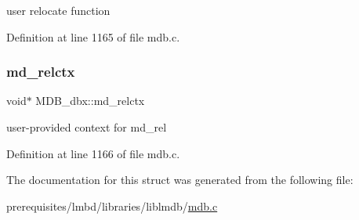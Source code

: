 user relocate function 

Definition at line 1165 of file mdb.\+c.

\mbox{\label{struct_m_d_b__dbx_a284dafb1b3df0d8b701d9cb72875fb95}} 
\subsubsection{\texorpdfstring{md\+\_\+relctx}{md\_relctx}}
{\footnotesize\ttfamily void$\ast$ M\+D\+B\+\_\+dbx\+::md\+\_\+relctx}

user-\/provided context for md\+\_\+rel 

Definition at line 1166 of file mdb.\+c.



The documentation for this struct was generated from the following file\+:\begin{DoxyCompactItemize}
\item 
prerequisites/lmbd/libraries/liblmdb/\mbox{\hyperlink{mdb_8c}{mdb.\+c}}\end{DoxyCompactItemize}
